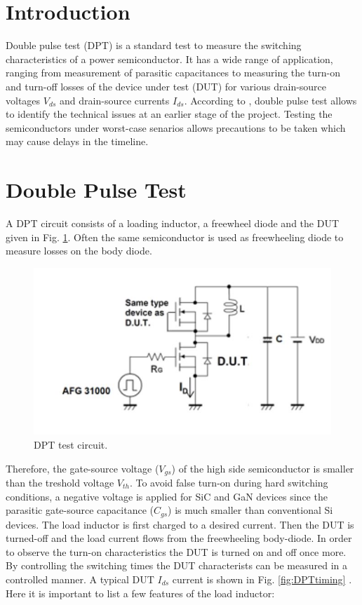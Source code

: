 \documentclass[12pt]{article} %
\begin{document}
\section{Introduction}
Double pulse test (DPT) is a standard test to measure the switching characteristics of a power semiconductor. It has a wide range of application, ranging from measurement of parasitic capacitances to measuring the turn-on and turn-off losses of the device under test (DUT) for various drain-source voltages $V_{ds}$ and drain-source currents $I_{ds}$. According to \cite{Infineon}, double pulse test allows to identify the technical issues at an earlier stage of the project. Testing the semiconductors under worst-case senarios allows precautions to be taken which may cause delays in the timeline.\\

\section{Double Pulse Test}
A DPT circuit consists of a loading inductor, a freewheel diode and the DUT given in Fig. \ref{fig:DPTcircuit}. Often the same semiconductor is used as freewheeling diode to measure losses on the body diode. 

\begin{figure}[h!]
	\includegraphics[scale=0.7]{figures/D_P_T.JPG}
	\caption{DPT test circuit.}
	\label{fig:DPTcircuit}
\end{figure}

Therefore, the gate-source voltage ($V_{gs}$) of the high side semiconductor is smaller than the treshold voltage $V_{th}$. To avoid false turn-on during hard switching conditions, a negative voltage is applied for SiC and GaN devices since the parasitic gate-source capacitance ($C_{gs}$) is much smaller than conventional Si devices. The load inductor is first charged to a desired current. Then the DUT is turned-off and the load current flows from the freewheeling body-diode. In order to observe the turn-on characteristics the DUT is turned on and off once more. By controlling the switching times the DUT characterists can be measured in a controlled manner. A typical DUT $I_{ds}$ current is shown in Fig. \ref{fig:DPTtiming} \cite{Infineon}.  Here it is important to list a few features of the load inductor:
\end{document}
